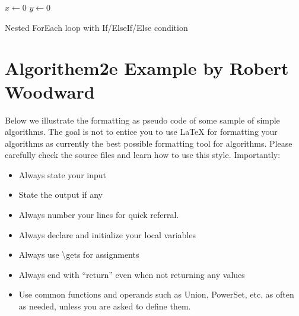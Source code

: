 \documentclass{article}
\begin{document}
  \bigskip %
 
 
 
\begin{algorithm}[H]
\DontPrintSemicolon
\SetAlgoLined
{}
\BlankLine
 
$x\leftarrow 0$    \;
$y\leftarrow 0$    \;
\BlankLine
{}
\caption{Nested ForEach loop with If/ElseIf/Else condition}
\end{algorithm}


  \section{Algorithem2e Example by Robert Woodward}

    Below we illustrate the formatting as pseudo code of some sample
    of simple algorithms. The goal is not to entice you to use
    \LaTeX\/ for formatting your algorithms as currently the best
    possible formatting tool for algorithms. Please carefully check
    the source files and learn how to use this style. Importantly:
    \begin{itemize}
    \item
    Always state your input
    \item
    State the output if any
    \item
    Always number your lines for quick referral.
    \item
    Always declare and initialize your local variables
    \item
    Always use \textbackslash gets for assignments
    \item
    Always end with ``return'' even when not returning any values
    \item
    Use common functions and operands such as {\sc Union}, {\sc PowerSet}, etc. as often as needed, unless you are asked to define them.
    \end{itemize}
    
\end{document}
